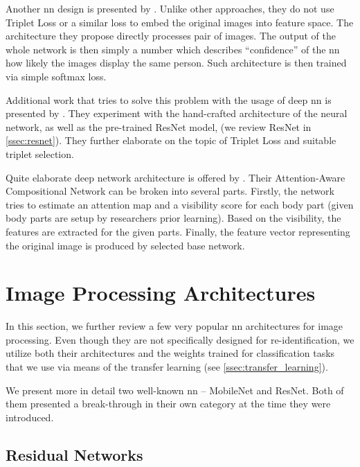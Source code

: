 Another \gls{nn} design is presented by \cite{li2014deepreid}. Unlike other approaches, they do not use Triplet Loss or a similar loss to embed the original images into feature space. The architecture they propose directly processes pair of images. The output of the whole network is then simply a number which describes ``confidence'' of the \gls{nn} how likely the images display the same person. Such architecture is then trained via simple softmax loss.

Additional work that tries to solve this problem with the usage of deep \gls{nn} is presented by \cite{hermans2017defense}. They experiment with the hand-crafted architecture of the neural network, as well as the pre-trained ResNet model, (we review ResNet in \autoref{ssec:resnet}). They further elaborate on the topic of Triplet Loss and suitable triplet selection.

Quite elaborate deep network architecture is offered by \cite{xu2018attention}. Their Attention-Aware Compositional Network can be broken into several parts. Firstly, the network tries to estimate an attention map and a visibility score for each body part (given body parts are setup by researchers prior learning). Based on the visibility, the features are extracted for the given parts. Finally, the feature vector representing the original image is produced by selected base network.

\section{Image Processing Architectures}

\label{sec:existing_architectures}

In this section, we further review a few very popular \gls{nn} architectures for image processing. Even though they are not specifically designed for re-identification, we utilize both their architectures and the weights trained for classification tasks that we use via means of the transfer learning (see \autoref{ssec:transfer_learning}).

We present more in detail two well-known \gls{nn} -- MobileNet and ResNet. Both of them presented a break-through in their own category at the time they were introduced.

\subsection{Residual Networks}
\label{ssec:resnet}


